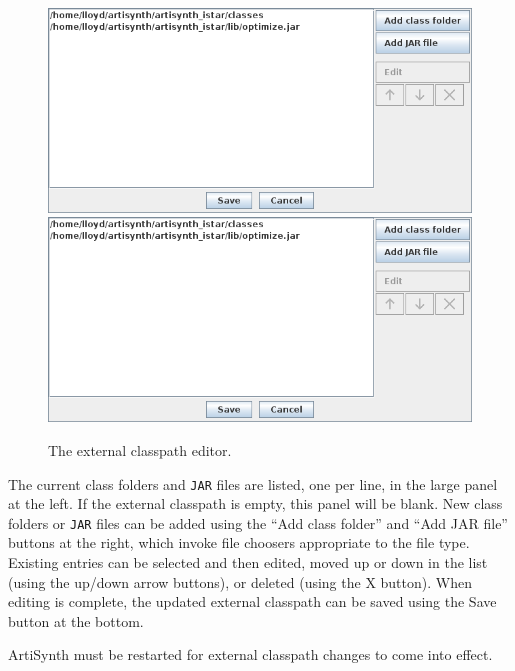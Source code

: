 \documentclass{article}
\begin{document}
\begin{figure}[h]
\begin{center}
\iflatexml
\includegraphics[]{images/externalClasspathEditor}
\else
\includegraphics[width=5in]{images/externalClasspathEditor}
\fi
\end{center}
\caption{The external classpath editor.}%
\label{externalClasspathEditor:fig}
\end{figure}

The current class folders and {\tt JAR} files are listed, one per
line, in the large panel at the left. If the external classpath is
empty, this panel will be blank. New class folders or {\tt JAR} files
can be added using the {\sf ``Add class folder''} and {\sf ``Add JAR file''}
buttons at the right, which invoke file choosers appropriate to the
file type. Existing entries can be selected and then edited, moved up
or down in the list (using the up/down arrow buttons), or deleted
(using the {\sf X} button). When editing is complete, the updated
external classpath can be saved using the {\sf Save} button at the
bottom.

\begin{sideblock}
ArtiSynth must be restarted for external classpath changes to come
into effect.
\end{sideblock}
\end{document}
